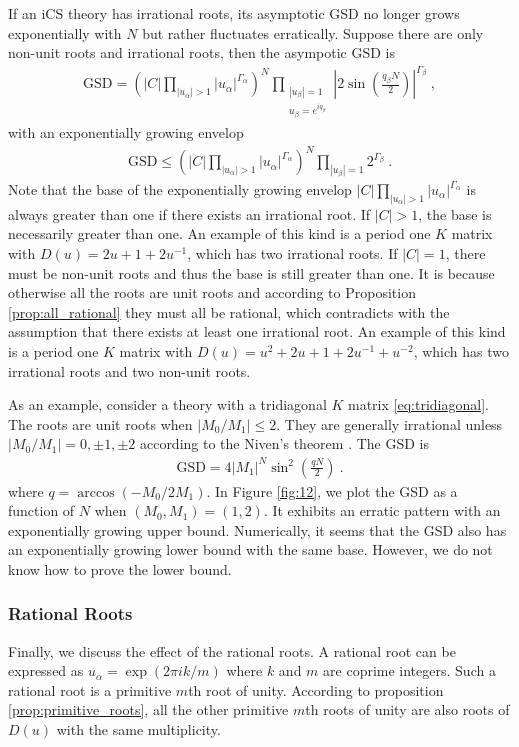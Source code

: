 \documentclass[aps,prb,twocolumn,superscriptaddress,floatfix,10pt,nofootinbib]{revtex4-2}
\newcommand{\ie}{\begin{equation}\begin{aligned}}
\newcommand{\fe}{\end{aligned}\end{equation}}
\theoremstyle{definition}
\begin{document}
If an iCS theory has irrational roots, its asymptotic GSD no longer grows exponentially with $N$ but rather fluctuates erratically. Suppose there are only non-unit roots and irrational roots, then the asympotic GSD is 
\ie\label{eq:GSD_rational_nonunit}
\text{GSD}=\left(|C|\prod_{|u_\alpha|>1}|u_\alpha|^{\Gamma_\alpha }\right)^N\prod_{\substack{|u_\beta|=1\\u_\beta=e^{iq_\beta}}}\left|2\sin\left(\frac{q_\beta N}{2}\right)\right|^{\Gamma_\beta}~,
\fe 
with an exponentially growing envelop 
\ie
\text{GSD}\leq\left(|C|\prod_{|u_\alpha|>1}|u_\alpha|^{\Gamma_\alpha }\right)^N\prod_{{|u_\beta|=1}}2^{\Gamma_\beta}~.
\fe
Note that the base of the exponentially growing envelop $|C|\prod_{|u_\alpha|>1}|u_\alpha|^{\Gamma_\alpha}$ is always greater than one if there exists an irrational root. If $|C|>1$, the base is necessarily greater than one. An example of this kind is a period one $K$ matrix with $D(u)=2u+1+2u^{-1}$, which has two irrational roots. If $|C|=1$, there must be non-unit roots and thus the base is still greater than one.
It is because otherwise all the roots are unit roots and according to Proposition \ref{prop:all_rational} they must all be rational, which contradicts with the assumption that there exists at least one irrational root. An example of this kind is a period one $K$ matrix with $D(u)=u^2+2u+1+2u^{-1}+u^{-2}$, which has two irrational roots and two non-unit roots.


As an example, consider a theory with a tridiagonal $K$ matrix \eqref{eq:tridiagonal}. The roots are unit roots when $|M_0/M_1|\leq2$. They are generally irrational unless  $|M_0/M_1|=0,\pm1,\pm2$ according to the Niven's theorem \cite{Niven}.
The GSD is
\ie
\text{GSD}=4|M_1|^N\sin^2\left(\frac{qN}{2}\right)~.
\fe
where $q=\arccos(-M_0/2M_1)$.
In Figure \ref{fig:12}, we plot the GSD as a function of $N$ when $(M_0,M_1)=(1,2)$. It exhibits an erratic pattern with an exponentially growing upper bound. Numerically, it seems that the GSD also has an exponentially growing lower bound with the same base. However, we do not know how to prove the lower bound.

\subsubsection{Rational Roots}
Finally, we discuss the effect of the rational roots. A rational root can be expressed as $u_\alpha=\exp(2\pi ik/m)$ where $k$ and $m$ are coprime integers. Such a rational root is a primitive $m$th root of unity. According to proposition \ref{prop:primitive_roots}, all the other primitive $m$th roots of unity are also roots of $D(u)$ with the same multiplicity.
\end{document}
